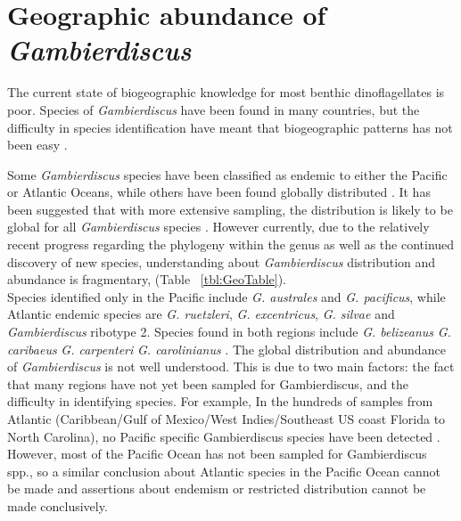 \documentclass[12pt]{article}
\begin{document}
\section{Geographic abundance of \emph{Gambierdiscus}}
The current state of biogeographic knowledge for most benthic dinoflagellates is poor. Species of \emph{Gambierdiscus} have been found in many countries, but the difficulty in species identification have meant that biogeographic patterns has not been easy \cite{marine2014}.

Some \emph{Gambierdiscus} species have been classified as endemic to either the Pacific or Atlantic Oceans, while others have been found globally distributed \cite{berdalet2012global,litaker2010global}. It has been suggested that with more extensive sampling, the distribution is likely to be global for all \emph{Gambierdiscus} species \cite{testerICHA}. However currently, due to the relatively recent progress regarding the phylogeny within the genus as well as the continued discovery of new species, understanding about \emph{Gambierdiscus} distribution and abundance is fragmentary, (Table ~\ref{tbl:GeoTable}). \\
Species identified only in the Pacific include \emph{G. australes} and \emph{G. pacificus}, while Atlantic endemic species are \emph{G. ruetzleri}, \emph{G. excentricus}, \emph{G. silvae} and \emph{Gambierdiscus} ribotype 2. Species found in both regions include \emph{G. belizeanus} \emph{G. caribaeus} \emph{G. carpenteri} \emph{G. carolinianus} \cite{litaker2010global,litaker2009taxonomy,berdalet2012global,fraga2014genus}. %
The global distribution and abundance of \emph{Gambierdiscus} is not well understood. 
This is due to two main factors: the fact that many regions have not yet been sampled for Gambierdiscus, and the difficulty in identifying species. For example,  In the hundreds of samples from Atlantic (Caribbean/Gulf of Mexico/West Indies/Southeast US coast Florida to North Carolina), no Pacific specific Gambierdiscus species have been detected \cite{berdalet2012global,litaker2010global}. However,  most of the Pacific Ocean has not been sampled for Gambierdiscus spp.,  so a similar conclusion about Atlantic species in the Pacific Ocean cannot be made and assertions about endemism or restricted distribution cannot be made conclusively.
\end{document}
